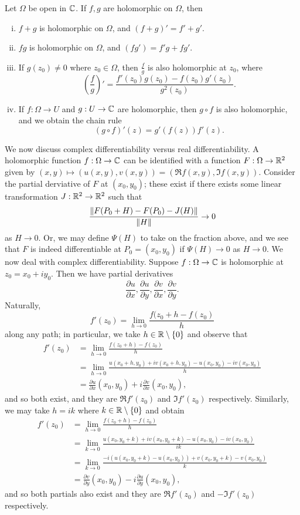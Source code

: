 \begin{proposition}
    Let $\Omega$ be open in $\mathbb C$. If $f, g$ are holomorphic on $\Omega$, then
    \begin{enumerate}[(i)]
        \item $f + g$ is holomorphic on $\Omega$, and $(f + g)' = f' + g'$.
        \item $fg$ is holomorphic on $\Omega$, and $(fg') = f'g + fg'$.
        \item If $g(z_0) \neq 0$ where $z_0 \in \Omega$, then $\frac{f}{g}$ is also holomorphic at $z_0$, where
        \[ \left(\frac{f}{g}\right)' = \frac{f'(z_0) g(z_0) - f(z_0) g'(z_0)}{g^2(z_0)}. \]
        \item If $f : \Omega \to U$ and $g : U \to \mathbb C$ are holomorphic, then $g \circ f$ is also holomorphic, and we obtain the chain rule
        \[ (g \circ f)'(z) = g'(f(z)) f'(z). \]
    \end{enumerate}
\end{proposition}
\noindent We now discuss complex differentiability versus real differentiability. A holomorphic function $f : \Omega \to \mathbb C$ can be identified with a function $F : \Omega \to \mathbb R^2$ given by $(x, y) \mapsto (u(x, y), v(x, y)) = (\Re f(x, y), \Im f(x, y))$. Consider the partial derviative of $F$ at $(x_0, y_0)$; these exist if there exists some linear transformation $J : \mathbb R^2 \to \mathbb R^2$ such that
\[ \frac{\left\lVert F(P_0 + H) - F(P_0) - J(H) \right\rVert}{\left\lVert H \right\rVert} \to 0 \]
as $H \to 0$. Or, we may define $\Psi(H)$ to take on the fraction above, and we see that $F$ is indeed differentiable at $P_0 = (x_0, y_0)$ if $\Psi(H) \to 0$ as $H \to 0$. We now deal with complex differentiability. Suppose $f : \Omega \to \mathbb C$ is holomorphic at $z_0 = x_0 + i y_0$. Then we have partial derivatives
\[ \frac{\partial u}{\partial x}, \frac{\partial u}{\partial y}, \frac{\partial v}{\partial x}, \frac{\partial v}{\partial y}. \]
Naturally,
\[ f'(z_0) = \lim_{h \to 0} \frac{f(z_0 + h - f(z_0)}{h} \]
along any path; in particular, we take $h \in \mathbb R \setminus \{0\}$ and observe that
\begin{align*}
    f'(z_0) &= \lim_{h \to 0} \frac{f(z_0 + h) - f(z_0)}{h} \\
    &= \lim_{h \to 0} \frac{u(x_0 + h, y_0) + iv(x_0 + h, y_0) - u(x_0, y_0) - iv(x_0, y_0)}{h} \\
    &= \frac{\partial u}{\partial x} (x_0, y_0) + i \frac{\partial v}{\partial x} (x_0, y_0),
\end{align*}
and so both exist, and they are $\Re f'(z_0)$ and $\Im f'(z_0)$ respectively. Similarly, we may take $h = ik$ where $k \in \mathbb R \setminus \{0\}$ and obtain
\begin{align*}
    f'(z_0) &= \lim_{h \to 0} \frac{f(z_0 + h) - f(z_0)}{h} \\
    &= \lim_{k \to 0} \frac{u(x_0, y_0 + k) + iv(x_0, y_0 + k) - u(x_0, y_0) - iv(x_0, y_0)}{ik} \\
    &= \lim_{k \to 0} \frac{-i(u(x_0, y_0 + k) - u(x_0, y_0)) + v(x_0, y_0 + k) - v(x_0, y_0)}{k} \\
    &= \frac{\partial v}{\partial y} (x_0, y_0) - i \frac{\partial u}{\partial y} (x_0, y_0),
\end{align*}
and so both partials also exist and they are $\Re f'(z_0)$ and $- \Im f'(z_0)$ respectively.